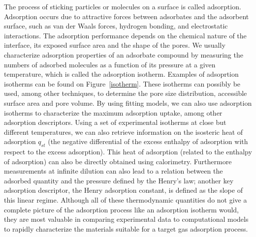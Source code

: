 \documentclass[main.tex]{subfiles}
\begin{document}
The process of sticking particles or molecules on a surface is called adsorption. Adsorption occurs due to attractive forces between adsorbates and the adsorbent surface, such as van der Waals forces, hydrogen bonding, and electrostatic interactions. The adsorption performance depends on the chemical nature of the interface, its exposed surface area and the shape of the pores. We usually characterize adsorption properties of an adsorbate compound by measuring the numbers of adsorbed molecules as a function of its pressure at a given temperature, which is called the adsorption isotherm. Examples of adsoprtion isotherms can be found on Figure~\ref{isotherm}. These isotherms can possibly be used, among other techniques, to determine the pore size distribution, accessible surface area and pore volume.\autocite{Rouquerol_1994} By using fitting models, we can also use adsorption isotherms to characterize the maximum adsorption uptake, among other adsorption descriptors.\autocite{Wang_2020} Using a set of experimental isotherms at close but different temperatures, we can also retrieve information on the isosteric heat of adsorption $q_{st}$ (the negative differential of the excess enthalpy of adsorption with respect to the excess adsorption).\autocite{Nicholson2000} This heat of adsorption (related to the enthalpy of adsorption) can also be directly obtained using calorimetry.\autocite{Dunne_1996} Furthermore measurements at infinite dilution can also lead to a relation between the adsorbed quantity and the pressure defined by the Henry's law; another key adsorption descriptor, the Henry adsorption constant, is defined as the slope of this linear regime.\autocite{Finsy2007} Although all of these thermodynamic quantities do not give a complete picture of the adsorption process like an adsorption isotherm would, they are most valuable in comparing experimental data to computational models to rapidly characterize the materials suitable for a target gas adsorption process.
\end{document}
